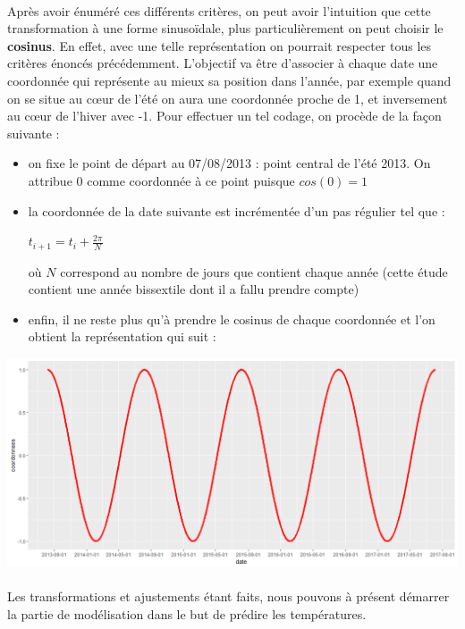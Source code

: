 \documentclass[14pt, openany]{article}
\begin{document}
\paragraph{}
Après avoir énuméré ces différents critères, on peut avoir l'intuition que cette transformation à une forme sinusoïdale, plus particulièrement on peut choisir le \textbf{cosinus}. En effet, avec une telle représentation on pourrait respecter tous les critères énoncés précédemment. L'objectif va être d'associer à chaque date une coordonnée qui représente au mieux sa position dans l'année, par exemple quand on se situe au cœur de l'été on aura une coordonnée proche de 1, et inversement au cœur de l'hiver avec -1. Pour effectuer un tel codage, on procède de la façon suivante :
\begin{itemize}
\item on fixe le point de départ au 07/08/2013 : point central de l'été 2013. On attribue 0 comme coordonnée à ce point puisque $cos(0)=1$
\item la coordonnée de la date suivante est incrémentée d'un pas régulier tel que :
\begin{center}
$t_{i+1}=t_{i}+ \frac{2\pi}{N}$
\end{center}
où $N$ correspond au nombre de jours que contient chaque année (cette étude contient une année bissextile dont il a fallu prendre compte)
\item enfin, il ne reste plus qu'à prendre le cosinus de chaque coordonnée et l'on obtient la représentation qui suit :
\end{itemize}
\includegraphics[width=17cm]{Images/date.png}
\begin{center}
\label{fig1}
\end{center}
\paragraph{}
Les transformations et ajustements étant faits, nous pouvons à présent démarrer la partie de modélisation dans le but de prédire les températures.
\end{document}
